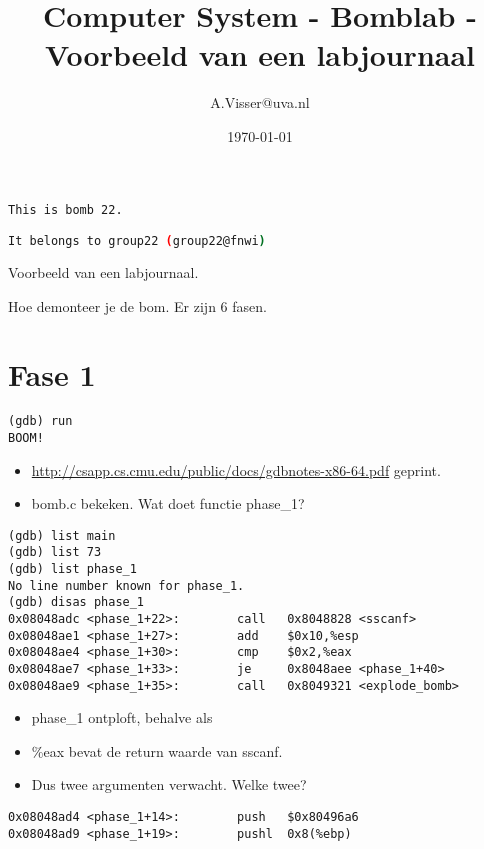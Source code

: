 \documentclass[12pt]{article}
\title{Computer System - Bomblab - Voorbeeld van een labjournaal}
\author{A.Visser@uva.nl}
\date{\today}
\begin{document}
\maketitle

\begin{lstlisting}[language=bash] 
This is bomb 22.

It belongs to group22 (group22@fnwi)
\end{lstlisting}

Voorbeeld van een labjournaal.

Hoe demonteer je de bom. Er zijn 6 fasen.

\section*{Fase 1}

\begin{lstlisting}[language={[x86masm]Assembler}] 
(gdb) run
BOOM!
\end{lstlisting}

\begin{itemize}
\item \url{http://csapp.cs.cmu.edu/public/docs/gdbnotes-x86-64.pdf} geprint.
\item bomb.c bekeken. Wat doet functie phase\_1?
\end{itemize}

\begin{lstlisting}[language={[x86masm]Assembler}]
(gdb) list main
(gdb) list 73
(gdb) list phase_1
No line number known for phase_1.
(gdb) disas phase_1
0x08048adc <phase_1+22>:        call   0x8048828 <sscanf>
0x08048ae1 <phase_1+27>:        add    $0x10,%esp
0x08048ae4 <phase_1+30>:        cmp    $0x2,%eax
0x08048ae7 <phase_1+33>:        je     0x8048aee <phase_1+40>
0x08048ae9 <phase_1+35>:        call   0x8049321 <explode_bomb>
\end{lstlisting}

\begin{itemize}
\item phase\_1 ontploft, behalve als %
\item \%eax bevat de return waarde van sscanf.
\item Dus twee argumenten verwacht. Welke twee?
\end{itemize}

\begin{lstlisting}[language={[x86masm]Assembler}]
0x08048ad4 <phase_1+14>:        push   $0x80496a6
0x08048ad9 <phase_1+19>:        pushl  0x8(%ebp) 
\end{lstlisting}
\end{document}
